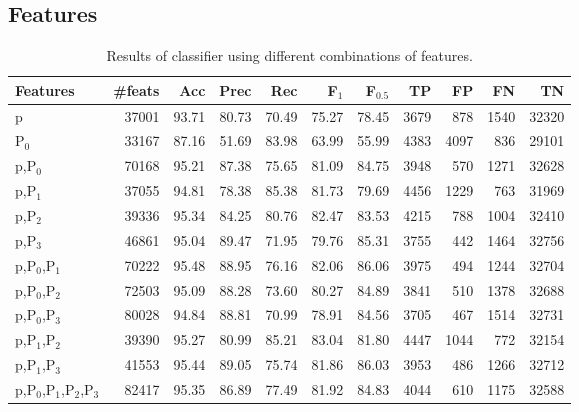 \documentclass[11pt]{article}
\begin{document}
\subsection{Features}
\label{sec-4-1}

\begin{table}[tbp]

\begin{tabular}{lrrrrrrrrrr}
Features & \#feats & Acc & Prec & Rec & F$_{\text{1}}$ & F$_{\text{0.5}}$ & TP & FP & FN & TN\\
\hline
p & 37001 & 93.71 & 80.73 & 70.49 & 75.27 & 78.45 & 3679 & 878 & 1540 & 32320\\
P$_{\text{0}}$ & 33167 & 87.16 & 51.69 & 83.98 & 63.99 & 55.99 & 4383 & 4097 & 836 & 29101\\
\hline
p,P$_{\text{0}}$ & 70168 & 95.21 & 87.38 & 75.65 & 81.09 & 84.75 & 3948 & 570 & 1271 & 32628\\
p,P$_{\text{1}}$ & 37055 & 94.81 & 78.38 & 85.38 & 81.73 & 79.69 & 4456 & 1229 & 763 & 31969\\
p,P$_{\text{2}}$ & 39336 & 95.34 & 84.25 & 80.76 & 82.47 & 83.53 & 4215 & 788 & 1004 & 32410\\
p,P$_{\text{3}}$ & 46861 & 95.04 & 89.47 & 71.95 & 79.76 & 85.31 & 3755 & 442 & 1464 & 32756\\
\hline
p,P$_{\text{0}}$,P$_{\text{1}}$ & 70222 & 95.48 & 88.95 & 76.16 & 82.06 & 86.06 & 3975 & 494 & 1244 & 32704\\
p,P$_{\text{0}}$,P$_{\text{2}}$ & 72503 & 95.09 & 88.28 & 73.60 & 80.27 & 84.89 & 3841 & 510 & 1378 & 32688\\
p,P$_{\text{0}}$,P$_{\text{3}}$ & 80028 & 94.84 & 88.81 & 70.99 & 78.91 & 84.56 & 3705 & 467 & 1514 & 32731\\
\hline
p,P$_{\text{1}}$,P$_{\text{2}}$ & 39390 & 95.27 & 80.99 & 85.21 & 83.04 & 81.80 & 4447 & 1044 & 772 & 32154\\
p,P$_{\text{1}}$,P$_{\text{3}}$ & 41553 & 95.44 & 89.05 & 75.74 & 81.86 & 86.03 & 3953 & 486 & 1266 & 32712\\
\hline
p,P$_{\text{0}}$,P$_{\text{1}}$,P$_{\text{2}}$,P$_{\text{3}}$ & 82417 & 95.35 & 86.89 & 77.49 & 81.92 & 84.83 & 4044 & 610 & 1175 & 32588\\
\end{tabular}

\caption{Results of classifier using different combinations of features.}
\label{tbl:feature-evaluation}
\end{table}
\end{document}
